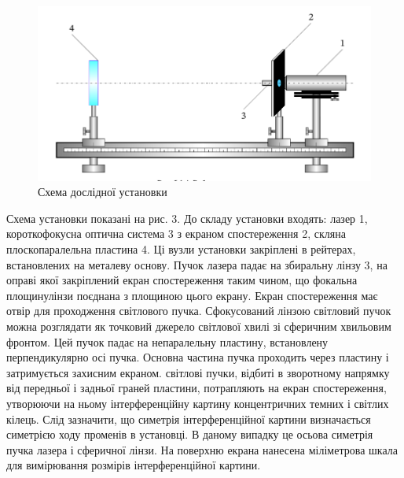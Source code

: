 \begin{figure}[h]
    \centering    
    \includegraphics[width=.6\textwidth]{assets/experiment_tools.png}
    \caption{Схема дослідної установки}
\end{figure}

Схема установки показані на рис. 3. До складу установки входять:
лазер 1, короткофокусна оптична система 3 з екраном спостереження 2,
скляна плоскопаралельна пластина 4. Ці вузли установки закріплені
в рейтерах, встановлених на металеву основу. Пучок лазера падає
на збиральну лінзу 3, на оправі якої закріплений екран спостереження
таким чином, що фокальна площинулінзи поєднана з площиною цього екрану. 
Екран спостереження має отвір для
проходження світлового пучка. Сфокусований лінзою світловий пучок можна
розглядати як точковий джерело світлової хвилі зі сферичним хвильовим фронтом.
Цей пучок падає на непаралельну пластину, встановлену перпендикулярно
осі пучка. Основна частина пучка проходить через пластину і затримується
захисним екраном. світлові пучки, відбиті в зворотному напрямку від передньої
і задньої граней пластини, потрапляють на екран спостереження, утворюючи на
ньому інтерференційну картину концентричних темних і світлих кілець. Слід
зазначити, що симетрія інтерференційної картини визначається симетрією ходу
променів в установці. В даному випадку це осьова симетрія пучка лазера і 
сферичної лінзи. На поверхню екрана нанесена міліметрова шкала для вимірювання
розмірів інтерференційної картини.

